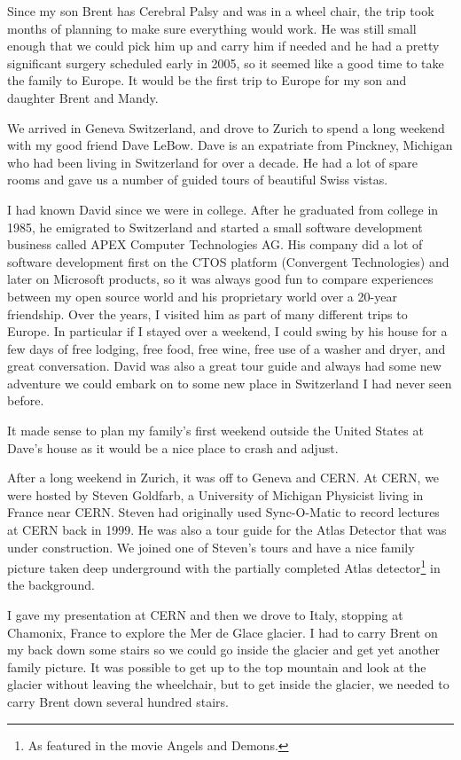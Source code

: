 \documentclass[12pt]{book}
\begin{document}
Since my son Brent has Cerebral Palsy and was in a wheel
chair, the trip took months of planning to make
sure everything would work.  He was still small enough that
we could pick him up and carry him if needed and he had
a pretty significant surgery scheduled early in 2005,
so it seemed like a good time to take the family to
Europe.  It would be the first trip to Europe for my son and daughter Brent
and Mandy.

We arrived in Geneva Switzerland, and drove to Zurich
to spend a long weekend with my good friend Dave LeBow.
Dave is an expatriate from Pinckney, Michigan who had been living
in Switzerland for over a decade.  He had a lot of spare
rooms and gave us a number of guided tours of
beautiful Swiss vistas.

I had known David since we were in college.   After he
graduated from college in 1985, he emigrated to
Switzerland and started a small software development business
called APEX Computer Technologies AG.
His company did a lot of software development
first on the CTOS platform (Convergent Technologies) and later on
Microsoft products, so it was always good fun to compare experiences between
my open source world and his proprietary world over a 20-year friendship.
Over the years, I visited him as part of many different trips to Europe.
In particular if I stayed over a weekend, I could swing by his house for
a few days of free lodging, free food, free wine, free use of a
washer and dryer, and great conversation.   David was also a great
tour guide and always had some new adventure we could embark on to
some new place in Switzerland I had never seen before.

It made sense to plan my family's first weekend outside the
United States at Dave's house as it would be a nice place to
crash and adjust.

After a long weekend in Zurich, it was off to Geneva and CERN.
At CERN, we were hosted by Steven Goldfarb, a University
of Michigan Physicist living in France near CERN.
Steven had originally used Sync-O-Matic
to record lectures at CERN back in 1999.  He
was also a tour guide for the Atlas Detector that
was under construction.  We joined one of Steven's tours
and have a nice family picture taken deep underground
with the partially completed Atlas detector\footnote{As featured in the movie
Angels and Demons.} in the background.

I gave my presentation at CERN and then we drove
to Italy, stopping at Chamonix, France
to explore the Mer de Glace glacier.  I had to carry Brent
on my back down some stairs so we could go inside
the glacier and get yet another family picture.
It was possible to get up to the top mountain and look
at the glacier without leaving the wheelchair, but
to get inside the glacier, we needed to carry Brent
down several hundred stairs.
\end{document}
